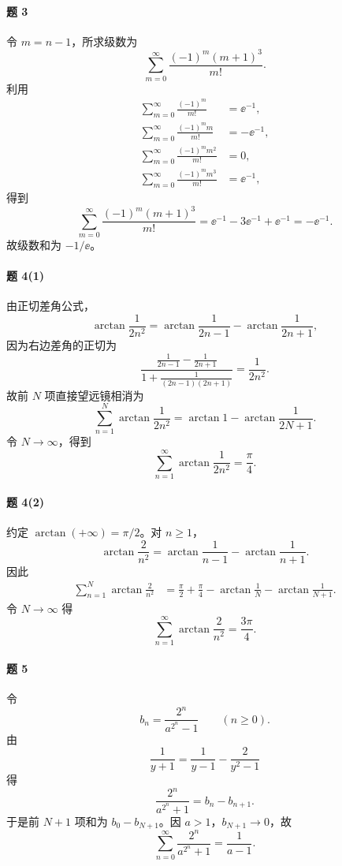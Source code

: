 \paragraph{题 3}
\begin{xsolution}
令 $m=n-1$，所求级数为
\[
  \sum_{m=0}^{\infty}\frac{(-1)^m(m+1)^3}{m!}.
\]
利用
\[
\begin{aligned}
  \sum_{m=0}^{\infty}\frac{(-1)^m}{m!}&=\ee^{-1},\\
  \sum_{m=0}^{\infty}\frac{(-1)^mm}{m!}&=-\ee^{-1},\\
  \sum_{m=0}^{\infty}\frac{(-1)^mm^2}{m!}&=0,\\
  \sum_{m=0}^{\infty}\frac{(-1)^mm^3}{m!}&=\ee^{-1},
\end{aligned}
\]
得到
\[
  \sum_{m=0}^{\infty}\frac{(-1)^m(m+1)^3}{m!}
  =\ee^{-1}-3\ee^{-1}+\ee^{-1}=-\ee^{-1}.
\]
故级数和为 $-1/\ee$。
\end{xsolution}

\paragraph{题 4(1)}
\begin{xsolution}
由正切差角公式，
\[
  \arctan\frac1{2n^2}
  =\arctan\frac1{2n-1}-\arctan\frac1{2n+1},
\]
因为右边差角的正切为
\[
  \frac{\frac1{2n-1}-\frac1{2n+1}}
  {1+\frac1{(2n-1)(2n+1)}}=\frac1{2n^2}.
\]
故前 $N$ 项直接望远镜相消为
\[
  \sum_{n=1}^N\arctan\frac1{2n^2}
  =\arctan1-\arctan\frac1{2N+1}.
\]
令 $N\to\infty$，得到
\[
  \sum_{n=1}^{\infty}\arctan\frac1{2n^2}=\frac\pi4.
\]
\end{xsolution}

\paragraph{题 4(2)}
\begin{xsolution}
约定 $\arctan(+\infty)=\pi/2$。对 $n\geqslant1$，
\[
  \arctan\frac2{n^2}
  =\arctan\frac1{n-1}-\arctan\frac1{n+1}.
\]
因此
\[
\begin{aligned}
  \sum_{n=1}^N\arctan\frac2{n^2}
  &=\frac\pi2+\frac\pi4
    -\arctan\frac1N-\arctan\frac1{N+1}.
\end{aligned}
\]
令 $N\to\infty$ 得
\[
  \sum_{n=1}^{\infty}\arctan\frac2{n^2}=\frac{3\pi}{4}.
\]
\end{xsolution}

\paragraph{题 5}
\begin{xsolution}
令
\[
  b_n=\frac{2^n}{a^{2^n}-1}\qquad(n\geqslant0).
\]
由
\[
  \frac1{y+1}=\frac1{y-1}-\frac2{y^2-1}
\]
得
\[
  \frac{2^n}{a^{2^n}+1}=b_n-b_{n+1}.
\]
于是前 $N+1$ 项和为 $b_0-b_{N+1}$。因 $a>1$，$b_{N+1}\to0$，故
\[
  \sum_{n=0}^{\infty}\frac{2^n}{a^{2^n}+1}=\frac1{a-1}.
\]
\end{xsolution}

